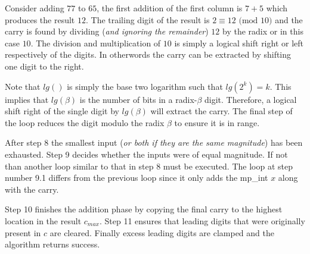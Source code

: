 \documentclass[b5paper]{book}
\begin{document}
Consider adding $77$ to $65$, the first addition of the first column is $7 + 5$ which produces the result $12$.  The trailing digit of the result
is $2 \equiv 12 \mbox{ (mod }10\mbox{)}$ and the carry is found by dividing (\textit{and ignoring the remainder}) $12$ by the radix or in this case $10$.  The
division and multiplication of $10$ is simply a logical shift right or left respectively of the digits.  In otherwords the carry can be extracted
by shifting one digit to the right.

Note that $lg()$ is simply the base two logarithm such that $lg(2^k) = k$.  This implies that $lg(\beta)$ is the number of bits in a radix-$\beta$ 
digit.  Therefore, a logical shift right of the single digit by $lg(\beta)$ will extract the carry.  The final step of the  loop reduces the digit 
modulo the radix $\beta$ to ensure it is in range.

After step 8 the smallest input (\textit{or both if they are the same magnitude}) has been exhausted.  Step 9 decides whether
the inputs were of equal magnitude.  If not than another loop similar to that in step 8 must be executed.  The loop at step
number 9.1 differs from the previous loop since it only adds the mp\_int $x$ along with the carry.  

Step 10 finishes the addition phase by copying the final carry to the highest location in the result $c_{max}$.  Step 11 ensures that 
leading digits that were originally present in $c$ are cleared.  Finally excess leading digits are clamped and the algorithm returns success.
\end{document}
